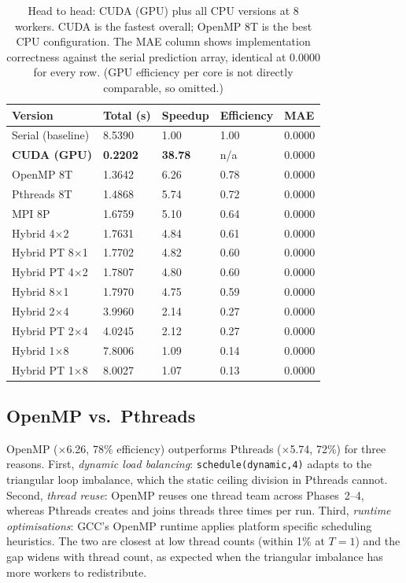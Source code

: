 \documentclass[11pt,a4paper]{article}
\newcommand{\code}[1]{\texttt{\small #1}}
\begin{document}
\begin{table}[!htbp]
\centering
\begin{tabular}{L{3.4cm} R{2.2cm} R{2.2cm} R{2.2cm} R{2.0cm}}
\toprule
\textbf{Version} & \textbf{Total (s)} & \textbf{Speedup} &
\textbf{Efficiency} & \textbf{MAE} \\
\midrule
Serial (baseline)        & 8.5390 & 1.00 & 1.00 & 0.0000 \\
\textbf{CUDA (GPU)}      & \textbf{0.2202} & \textbf{38.78} & n/a & 0.0000 \\
OpenMP 8T                & 1.3642 & 6.26 & 0.78 & 0.0000 \\
Pthreads 8T              & 1.4868 & 5.74 & 0.72 & 0.0000 \\
MPI 8P                   & 1.6759 & 5.10 & 0.64 & 0.0000 \\
Hybrid 4$\times$2        & 1.7631 & 4.84 & 0.61 & 0.0000 \\
Hybrid PT 8$\times$1     & 1.7702 & 4.82 & 0.60 & 0.0000 \\
Hybrid PT 4$\times$2     & 1.7807 & 4.80 & 0.60 & 0.0000 \\
Hybrid 8$\times$1        & 1.7970 & 4.75 & 0.59 & 0.0000 \\
Hybrid 2$\times$4        & 3.9960 & 2.14 & 0.27 & 0.0000 \\
Hybrid PT 2$\times$4     & 4.0245 & 2.12 & 0.27 & 0.0000 \\
Hybrid 1$\times$8        & 7.8006 & 1.09 & 0.14 & 0.0000 \\
Hybrid PT 1$\times$8     & 8.0027 & 1.07 & 0.13 & 0.0000 \\
\bottomrule
\end{tabular}
\caption{Head to head: CUDA (GPU) plus all CPU versions at 8 workers. CUDA is the
fastest overall; OpenMP 8T is the best CPU configuration. The MAE column shows
implementation correctness against the serial prediction array,
identical at 0.0000 for every row. (GPU efficiency per core is not directly
comparable, so omitted.)}
\end{table}

\subsection{OpenMP vs.\ Pthreads}

OpenMP ($\times$6.26, 78\% efficiency) outperforms Pthreads ($\times$5.74, 72\%)
for three reasons. First, \emph{dynamic load balancing}:
\code{schedule(dynamic,4)} adapts to the triangular loop imbalance, which the
static ceiling division in Pthreads cannot. Second, \emph{thread reuse}: OpenMP
reuses one thread team across Phases~2--4, whereas Pthreads creates and joins
threads three times per run. Third, \emph{runtime optimisations}: GCC's OpenMP
runtime applies platform specific scheduling heuristics. The two are closest at
low thread counts (within 1\% at $T=1$) and the gap widens with thread count, as
expected when the triangular imbalance has more workers to redistribute.
\end{document}
